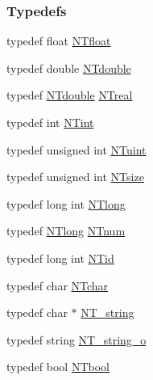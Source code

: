 \subsubsection*{Typedefs}
\begin{DoxyCompactItemize}
\item 
typedef float \hyperlink{nt__types_8h_afe18c05634a674e4c36a51d9839be77b}{NTfloat}
\item 
typedef double \hyperlink{nt__types_8h_a83a0562e7df446bc32e2d8de1675e721}{NTdouble}
\item 
typedef \hyperlink{nt__types_8h_a83a0562e7df446bc32e2d8de1675e721}{NTdouble} \hyperlink{nt__types_8h_a814a97893e9deb1eedcc7604529ba80d}{NTreal}
\item 
typedef int \hyperlink{nt__types_8h_aee8aa0a9869e8b5c97c6c02217ff09cd}{NTint}
\item 
typedef unsigned int \hyperlink{nt__types_8h_ac503559f358539d91155f135ee7a365d}{NTuint}
\item 
typedef unsigned int \hyperlink{nt__types_8h_a06c124f2e4469769b58230253ce0560b}{NTsize}
\item 
typedef long int \hyperlink{nt__types_8h_a66974263168dc9ddcc3a275844dc632f}{NTlong}
\item 
typedef \hyperlink{nt__types_8h_a66974263168dc9ddcc3a275844dc632f}{NTlong} \hyperlink{nt__types_8h_a2b739eac0beddc8a5dac5311c2ba7320}{NTnum}
\item 
typedef long int \hyperlink{nt__types_8h_ab5cab5f78fdd2211c340cbe527a4afd7}{NTid}
\item 
typedef char \hyperlink{nt__types_8h_a2f8aef15108d185e7c6f2642895b6a41}{NTchar}
\item 
typedef char $\ast$ \hyperlink{nt__types_8h_a6ad3365da89b8087ee1b784feec0d896}{NT\_\-string}
\item 
typedef string \hyperlink{nt__types_8h_ae904a7013d8622f8e95e30d449f42283}{NT\_\-string\_\-o}
\item 
typedef bool \hyperlink{nt__types_8h_a9f3200824a52174bb5be77bed3838822}{NTbool}
\end{DoxyCompactItemize}

